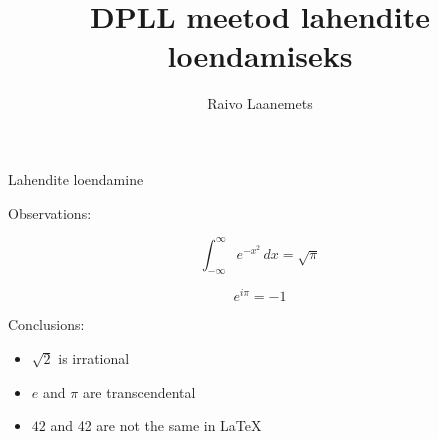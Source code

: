 \documentclass[pdf,azure,slideBW,nocolorBG,nototal]{prosper}
\title{DPLL meetod lahendite loendamiseks}
\author{Raivo Laanemets}
\begin{document}
\maketitle

\begin{slide}{Lahendite loendamine}

Observations:

\[
    \int_{-\infty}^\infty e^{-x^2} \, dx = \sqrt{\pi}
\]

\[
    e^{i\pi} = -1
\]

Conclusions:

\begin{itemize}
    \item $\sqrt{2}$ is irrational
    \item $e$ and $\pi$ are transcendental
    \item $42$ and 42 are not the same in \LaTeX
\end{itemize}

\end{slide}
\end{document}
